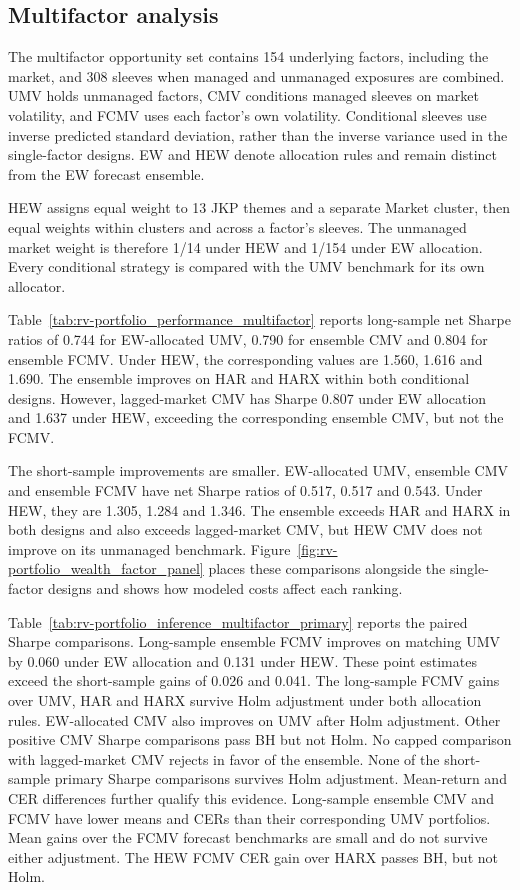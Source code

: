 \documentclass[preprint,12pt,authoryear]{elsarticle}
\begin{document}
\subsection{Multifactor analysis}
\label{sec:multifactor-results}

The multifactor opportunity set contains 154 underlying factors, including the market, and 308 sleeves when managed and unmanaged exposures are combined. UMV holds unmanaged factors, CMV conditions managed sleeves on market volatility, and FCMV uses each factor's own volatility. Conditional sleeves use inverse predicted standard deviation, rather than the inverse variance used in the single-factor designs. EW and HEW denote allocation rules and remain distinct from the EW forecast ensemble.

HEW assigns equal weight to 13 JKP themes and a separate Market cluster, then equal weights within clusters and across a factor's sleeves. The unmanaged market weight is therefore 1/14 under HEW and 1/154 under EW allocation. Every conditional strategy is compared with the UMV benchmark for its own allocator.

Table~\ref{tab:rv-portfolio_performance_multifactor} reports long-sample net Sharpe ratios of 0.744 for EW-allocated UMV, 0.790 for ensemble CMV and 0.804 for ensemble FCMV. Under HEW, the corresponding values are 1.560, 1.616 and 1.690. The ensemble improves on HAR and HARX within both conditional designs. However, lagged-market CMV has Sharpe 0.807 under EW allocation and 1.637 under HEW, exceeding the corresponding ensemble CMV, but not the FCMV. 

The short-sample improvements are smaller. EW-allocated UMV, ensemble CMV and ensemble FCMV have net Sharpe ratios of 0.517, 0.517 and 0.543. Under HEW, they are 1.305, 1.284 and 1.346. The ensemble exceeds HAR and HARX in both designs and also exceeds lagged-market CMV, but HEW CMV does not improve on its unmanaged benchmark. Figure~\ref{fig:rv-portfolio_wealth_factor_panel} places these comparisons alongside the single-factor designs and shows how modeled costs affect each ranking.

Table~\ref{tab:rv-portfolio_inference_multifactor_primary} reports the paired Sharpe comparisons. Long-sample ensemble FCMV improves on matching UMV by 0.060 under EW allocation and 0.131 under HEW. These point estimates exceed the short-sample gains of 0.026 and 0.041. The long-sample FCMV gains over UMV, HAR and HARX survive Holm adjustment under both allocation rules. EW-allocated CMV also improves on UMV after Holm adjustment. Other positive CMV Sharpe comparisons pass BH but not Holm. No capped comparison with lagged-market CMV rejects in favor of the ensemble. None of the short-sample primary Sharpe comparisons survives Holm adjustment. Mean-return and CER differences further qualify this evidence. Long-sample ensemble CMV and FCMV have lower means and CERs than their corresponding UMV portfolios. Mean gains over the FCMV forecast benchmarks are small and do not survive either adjustment. The HEW FCMV CER gain over HARX passes BH, but not Holm.
\end{document}
